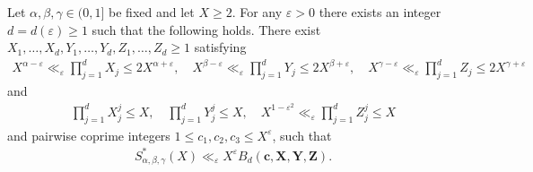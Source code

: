 \begin{proposition}\label{prop:DiophantineReduction}
  \leanok
Let $\alpha,\beta,\gamma\in (0,1]$ be fixed and let $X\geq 2$. For any $\varepsilon>0$ there exists an integer $d=d(\varepsilon)\geq 1$ such that the following holds.
There exist $X_1,\ldots, X_d,Y_1,\ldots, Y_d, Z_1,\ldots, Z_d\geq 1$ satisfying
\begin{align}\label{eq:xiyizi_1}
X^{\alpha-\varepsilon}\ll_{\varepsilon} \prod_{j=1}^{d}X_j\leq 2 X^{\alpha+\varepsilon},\quad
X^{\beta-\varepsilon}\ll_{\varepsilon}\prod_{j=1}^{d}Y_j\leq 2 X^{\beta+\varepsilon},\quad
X^{\gamma-\varepsilon}\ll_{\varepsilon}\prod_{j=1}^{d}Z_j\leq 2 X^{\gamma+\varepsilon}
\end{align}
and
\begin{align}\label{eq:xiyizi_2}
\prod_{j=1}^d X_j^j \leq X, \quad \prod_{j=1}^d Y_j^j\leq X,\quad X^{1-\varepsilon^2}\ll_{\varepsilon} \prod_{j=1}^d Z_j^j\leq X
\end{align}
and pairwise coprime integers $1\leq c_1,c_2,c_3\leq X^{\varepsilon}$, such that
\begin{align*}
S^*_{\alpha,\beta,\gamma}(X) \ll_{\varepsilon} X^{\varepsilon}B_d(\mathbf{c},\mathbf{X},\mathbf{Y},\mathbf{Z}).
\end{align*}
\end{proposition}

